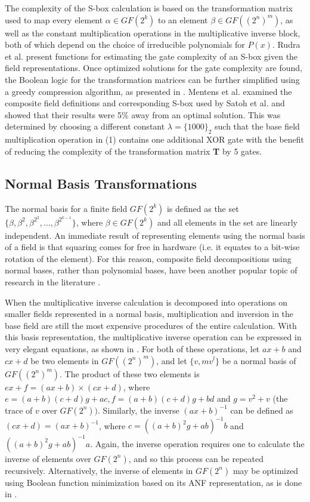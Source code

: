 The complexity of the S-box calculation is based on the transformation matrix used to map every element
$\alpha \in GF(2^k)$ to an element $\beta \in GF((2^n)^m)$, as well as the constant multiplication 
operations in the multiplicative inverse block, both of which depend on the choice of
irreducible polynomials for $P(x)$. Rudra et al. \cite{Rudra01-1} present functions for
estimating the gate complexity of an S-box given the field representations. Once optimized solutions for the
gate complexity are found, the Boolean logic for the transformation matrices can be further
simplified using a greedy compression algorithm, as presented in \cite{Morioka99-1}.
Mentens et al. \cite{Mentens05-1} examined the composite field definitions and corresponding
S-box used by Satoh et al. and showed that their results were 5\% away from an optimal solution.
This was determined by choosing a different constant $\lambda = \{1000\}_2$ such that the 
base field multiplication operation in (1) contains one additional XOR gate with the benefit
of reducing the complexity of the transformation matrix \textbf{T} by 5 gates.

\subsection{Normal Basis Transformations}
The normal basis for a finite field $GF(2^k)$ is defined as the set $\{\beta, \beta^2, \beta^{2^2},\dots,\beta^{2^{k-1}}\}$, 
where $\beta \in GF(2^k)$ and all elements in the set are linearly independent. An immediate result of representing
elements using the normal basis of a field is that squaring comes for free in hardware (i.e. it equates to a bit-wise
rotation of the element). For this reason, composite field decompositions using normal bases, rather than polynomial
bases, have been another popular topic of research in the literature \cite{Nikova08-1, Canright05-1}.

When the multiplicative inverse calculation is decomposed into operations on smaller fields
represented in a normal basis, multiplication and inversion in the base field are still the most expensive procedures of the 
entire calculation. With this basis representation, the multiplicative
inverse operation can be expressed in very elegant equations, as shown in \cite{Nikova08-1}. 
For both of these operations, let $ax + b$ and $cx + d$ be two elements in $GF((2^n)^m)$,
and let $\{v,m v^l\}$ be a normal basis of $GF((2^n)^m)$. The product of these
two elements is $ex + f = (ax + b) \times (cx + d)$, where $e = (a + b)(c + d)g + ac, f = (a + b)(c + d)g + bd$ and 
$g = v^2 + v$ (the trace of $v$ over $GF(2^n))$. Similarly, the inverse $(ax + b)^{-1}$ can be defined
as $(cx + d) = (ax + b)^{-1}$, where $c = ((a + b)^2g + ab)^{-1}b$ and $((a + b)^2g + ab)^{-1}a$.
Again, the inverse operation requires one to calculate the inverse of elements over $GF(2^n)$,
and so this process can be repeated recursively. Alternatively, the inverse of elements in $GF(2^n)$ 
may be optimized using Boolean function minimization based on its ANF representation, as is done in \cite{Nikova08-1}. 

